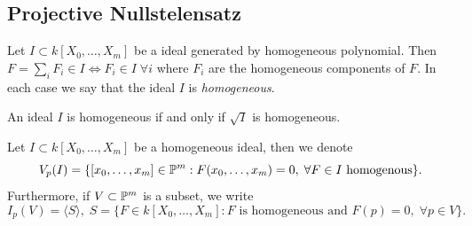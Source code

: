 \subsection{Projective Nullstelensatz}
\begin{dang}
    \begin{proposition}
        Let $I\subset k[X_0,\dots, X_m]$ be a ideal generated by homogeneous polynomial. Then 
        $F = \sum_i F_i\in I\iff F_i\in I\;\forall i$ where $F_i$ are the homogeneous components of $F$. In each 
        case we say that the ideal $I$ is \textit{homogeneous}.
    \end{proposition}
\end{dang}

\begin{dang}
    \begin{proposition}
        An ideal $I$ is homogeneous if and only if $\sqrt{I}$ is homogeneous.
    \end{proposition}
\end{dang}

\begin{notation}
    Let $I\subset k[X_0,\dots,X_m]$ be a homogeneous ideal, then we denote 
    \begin{equation}
        V_p(I) = \{[x_0,\dots,x_m]\in\mathbb{P}^m: F(x_0,\dots,x_m)=0,\;\forall F\in I\text{ homogenous}\}.
    \end{equation}
    Furthermore, if $V\subset \mathbb{P}^m$ is a subset, we write 
    \begin{equation}
        I_p(V)=\langle S\rangle,\;S=\{F\in k[X_0,\dots,X_m]: F\text{ is homogeneous and }F(p)=0,\;\forall p\in V\}.
    \end{equation}
\end{notation}


